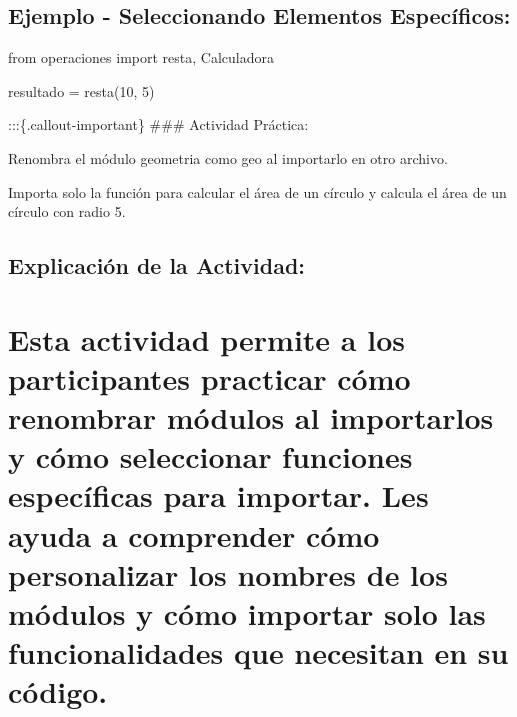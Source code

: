 \documentclass[
  a4paper,
  onepage,
  openany]{scrreprt}
\newenvironment{Shaded}{\begin{snugshade}}{\end{snugshade}}
\newcommand{\DecValTok}[1]{\textcolor[rgb]{0.68,0.00,0.00}{#1}}
\newcommand{\ImportTok}[1]{\textcolor[rgb]{0.00,0.46,0.62}{#1}}
\newcommand{\NormalTok}[1]{\textcolor[rgb]{0.00,0.23,0.31}{#1}}
\newcommand{\OperatorTok}[1]{\textcolor[rgb]{0.37,0.37,0.37}{#1}}
\begin{document}
\hypertarget{ejemplo---seleccionando-elementos-especuxedficos}{%
\section{Ejemplo - Seleccionando Elementos
Específicos:}\label{ejemplo---seleccionando-elementos-especuxedficos}}

\begin{Shaded}
\begin{Highlighting}[]
\ImportTok{from}\NormalTok{ operaciones }\ImportTok{import}\NormalTok{ resta, Calculadora}

\NormalTok{resultado }\OperatorTok{=}\NormalTok{ resta(}\DecValTok{10}\NormalTok{, }\DecValTok{5}\NormalTok{)}
\end{Highlighting}
\end{Shaded}

:::\{.callout-important\} \#\#\# Actividad Práctica:

Renombra el módulo geometria como geo al importarlo en otro archivo.

Importa solo la función para calcular el área de un círculo y calcula el
área de un círculo con radio 5.

\hypertarget{explicaciuxf3n-de-la-actividad-60}{%
\section{Explicación de la
Actividad:}\label{explicaciuxf3n-de-la-actividad-60}}

\hypertarget{esta-actividad-permite-a-los-participantes-practicar-cuxf3mo-renombrar-muxf3dulos-al-importarlos-y-cuxf3mo-seleccionar-funciones-especuxedficas-para-importar.-les-ayuda-a-comprender-cuxf3mo-personalizar-los-nombres-de-los-muxf3dulos-y-cuxf3mo-importar-solo-las-funcionalidades-que-necesitan-en-su-cuxf3digo.}{%
\chapter{Esta actividad permite a los participantes practicar cómo
renombrar módulos al importarlos y cómo seleccionar funciones
específicas para importar. Les ayuda a comprender cómo personalizar los
nombres de los módulos y cómo importar solo las funcionalidades que
necesitan en su
código.}\label{esta-actividad-permite-a-los-participantes-practicar-cuxf3mo-renombrar-muxf3dulos-al-importarlos-y-cuxf3mo-seleccionar-funciones-especuxedficas-para-importar.-les-ayuda-a-comprender-cuxf3mo-personalizar-los-nombres-de-los-muxf3dulos-y-cuxf3mo-importar-solo-las-funcionalidades-que-necesitan-en-su-cuxf3digo.}}
\end{document}
